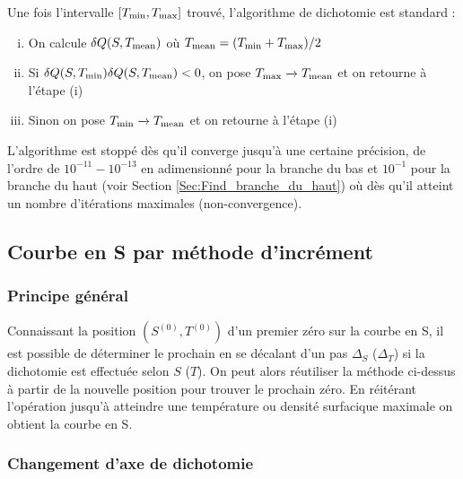 \documentclass[a4paper,12pt]{article}
\begin{document}
        Une fois l'intervalle $[T_{\rm{min}}, T_{\rm{max}}]$ trouvé, l'algorithme de dichotomie est standard : 
        \begin{enumerate}[(i)]
            \item On calcule $\delta Q(S, T_{\rm{mean}})$ où $T_{\rm{mean}} = (T_{\rm{min}}+T_{\rm{max}})/2$
            \item Si $\delta Q (S, T_{\rm{min}}) \delta Q (S, T_{\rm{mean}}) < 0$, on pose $T_{\rm{max}} \xrightarrow{} T_{\rm{mean}}$ et on retourne à l'étape (i)
            \item Sinon on pose $T_{\rm{min}} \xrightarrow{} T_{\rm{mean}}$ et on retourne à l'étape (i)
        \end{enumerate}
        L'algorithme est stoppé dès qu'il converge jusqu'à une certaine précision, de l'ordre de $10^{-11} - 10^{-13}$ en adimensionné pour la branche du bas et $10^{-1}$ pour la branche du haut (voir Section \ref{Sec:Find_branche_du_haut}) où dès qu'il atteint un nombre d'itérations maximales (non-convergence).
        
    \subsection{Courbe en S par méthode d'incrément}
        \subsubsection{Principe général}
            \label{Sec:Dicho_general}
    
            Connaissant la position $(S^{(0)} , T^{(0)})$ d'un premier zéro sur la courbe en S, il est possible de déterminer le prochain en se décalant d'un pas $\Delta_S$ ($\Delta_T$) si la dichotomie est effectuée selon $S$ ($T$). On peut alors réutiliser la méthode ci-dessus à partir de la nouvelle position pour trouver le prochain zéro.
            En réitérant l'opération jusqu'à atteindre une température ou densité surfacique maximale on obtient la courbe en S.
        
        \subsubsection{Changement d'axe de dichotomie}
          \label{Sec:Change_axe}
        
\end{document}
